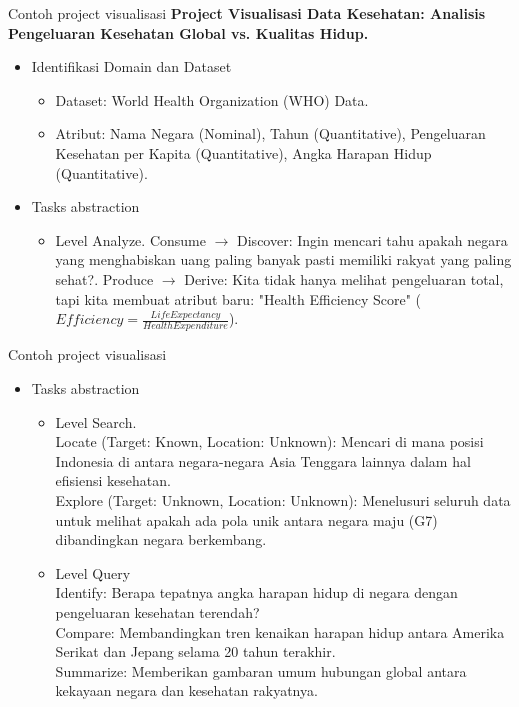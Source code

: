 \documentclass[t]{beamer}
\begin{document}
\begin{frame}{Contoh project visualisasi}
\textbf{Project Visualisasi Data Kesehatan: Analisis Pengeluaran Kesehatan Global vs. Kualitas Hidup.}

\begin{itemize}
	\item Identifikasi Domain dan Dataset
	\begin{itemize}	
		\item Dataset: World Health Organization (WHO) Data.
		\item Atribut: Nama Negara (Nominal), Tahun (Quantitative), Pengeluaran Kesehatan per Kapita (Quantitative), Angka Harapan Hidup (Quantitative).
	\end{itemize}
	\item Tasks abstraction
	
	\begin{itemize}	
		\item Level Analyze. Consume $\rightarrow$ Discover: Ingin mencari tahu apakah negara yang menghabiskan uang paling banyak pasti memiliki rakyat yang paling sehat?. Produce $\rightarrow$ Derive: Kita tidak hanya melihat pengeluaran total, tapi kita membuat atribut baru: "Health Efficiency Score" ($Efficiency = \frac{Life Expectancy}{Health Expenditure}$).
		
	\end{itemize}
\end{itemize}
\end{frame}


\begin{frame}{Contoh project visualisasi}
\begin{itemize}
	\item Tasks abstraction
	\begin{itemize}
		\item Level Search.\\
		 Locate (Target: Known, Location: Unknown): Mencari di mana posisi Indonesia di antara negara-negara Asia Tenggara lainnya dalam hal efisiensi kesehatan. \\
		 Explore (Target: Unknown, Location: Unknown): Menelusuri seluruh data untuk melihat apakah ada pola unik antara negara maju (G7) dibandingkan negara berkembang.
		\item Level Query \\
		Identify: Berapa tepatnya angka harapan hidup di negara dengan pengeluaran kesehatan terendah? \\
		Compare: Membandingkan tren kenaikan harapan hidup antara Amerika Serikat dan Jepang selama 20 tahun terakhir. \\
		Summarize: Memberikan gambaran umum hubungan global antara kekayaan negara dan kesehatan rakyatnya.
	\end{itemize}
\end{itemize}
\end{frame}
\end{document}
